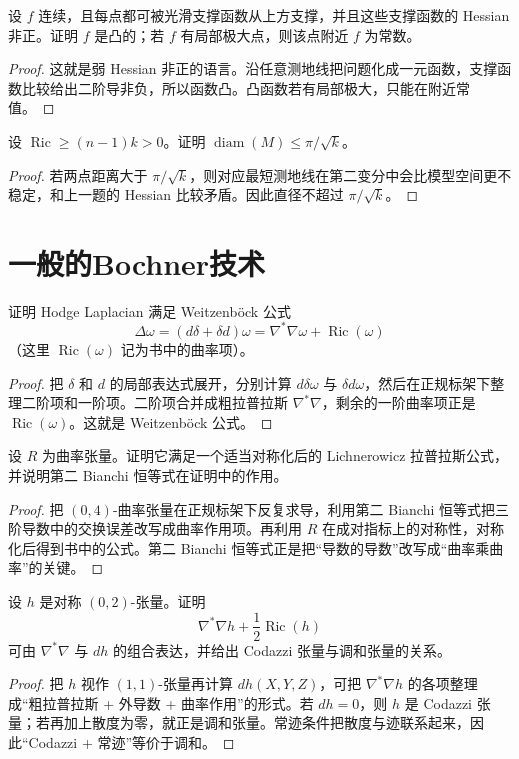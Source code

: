 \documentclass[11pt,a4paper,openany]{ctexbook}
\numberwithin{equation}{chapter}
\begin{document}
\begin{problem}
设 \(f\) 连续，且每点都可被光滑支撑函数从上方支撑，并且这些支撑函数的 Hessian 非正。证明 \(f\) 是凸的；若 \(f\) 有局部极大点，则该点附近 \(f\) 为常数。
\end{problem}
\begin{proof}
这就是弱 Hessian 非正的语言。沿任意测地线把问题化成一元函数，支撑函数比较给出二阶导非负，所以函数凸。凸函数若有局部极大，只能在附近常值。
\end{proof}

\begin{problem}
设 \(\operatorname{Ric}\ge (n-1)k>0\)。证明 \(\operatorname{diam}(M)\le \pi/\sqrt{k}\)。
\end{problem}
\begin{proof}
若两点距离大于 \(\pi/\sqrt{k}\)，则对应最短测地线在第二变分中会比模型空间更不稳定，和上一题的 Hessian 比较矛盾。因此直径不超过 \(\pi/\sqrt{k}\)。
\end{proof}

\section{一般的Bochner技术}

\begin{problem}
证明 Hodge Laplacian 满足 Weitzenb\"ock 公式
\[
\Delta\omega=(d\delta+\delta d)\omega=\nabla^*\nabla\omega+\operatorname{Ric}(\omega)
\]
（这里 \(\operatorname{Ric}(\omega)\) 记为书中的曲率项）。
\end{problem}
\begin{proof}
把 \(\delta\) 和 \(d\) 的局部表达式展开，分别计算 \(d\delta\omega\) 与 \(\delta d\omega\)，然后在正规标架下整理二阶项和一阶项。二阶项合并成粗拉普拉斯 \(\nabla^*\nabla\)，剩余的一阶曲率项正是 \(\operatorname{Ric}(\omega)\)。这就是 Weitzenb\"ock 公式。
\end{proof}

\begin{problem}
设 \(R\) 为曲率张量。证明它满足一个适当对称化后的 Lichnerowicz 拉普拉斯公式，并说明第二 Bianchi 恒等式在证明中的作用。
\end{problem}
\begin{proof}
把 \((0,4)\)-曲率张量在正规标架下反复求导，利用第二 Bianchi 恒等式把三阶导数中的交换误差改写成曲率作用项。再利用 \(R\) 在成对指标上的对称性，对称化后得到书中的公式。第二 Bianchi 恒等式正是把“导数的导数”改写成“曲率乘曲率”的关键。
\end{proof}

\begin{problem}
设 \(h\) 是对称 \((0,2)\)-张量。证明
\[
\nabla^*\nabla h+\frac12\operatorname{Ric}(h)
\]
可由 \(\nabla^*\nabla\) 与 \(dh\) 的组合表达，并给出 Codazzi 张量与调和张量的关系。
\end{problem}
\begin{proof}
把 \(h\) 视作 \((1,1)\)-张量再计算 \(dh(X,Y,Z)\)，可把 \(\nabla^*\nabla h\) 的各项整理成“粗拉普拉斯 + 外导数 + 曲率作用”的形式。若 \(dh=0\)，则 \(h\) 是 Codazzi 张量；若再加上散度为零，就正是调和张量。常迹条件把散度与迹联系起来，因此“Codazzi + 常迹”等价于调和。
\end{proof}
\end{document}
